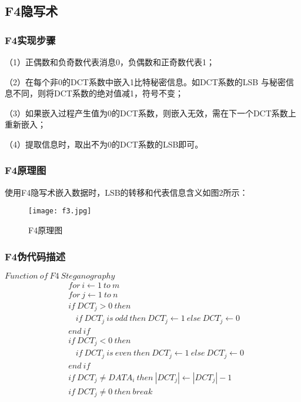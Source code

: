 \documentclass[onecolumn,a4paper,12pt]{article}
\begin{document}
\subsection{F4隐写术}

\subsubsection{F4实现步骤}

（1）正偶数和负奇数代表消息0，负偶数和正奇数代表1；

（2）在每个非0的DCT系数中嵌入1比特秘密信息。如DCT系数的LSB 与秘密信息不同，则将DCT系数的绝对值减1，符号不变；

（3）如果嵌入过程产生值为0的DCT系数，则嵌入无效，需在下一个DCT系数上重新嵌入；

（4）提取信息时，取出不为0的DCT系数的LSB即可。

\subsubsection{F4原理图}

使用F4隐写术嵌入数据时，LSB的转移和代表信息含义如图2所示：

\begin{figure}[H]
  \centering
  \texttt{[image: f3.jpg]}\\
  \caption{F4原理图}\label{F4原理图}
\end{figure}

\subsubsection{F4伪代码描述}
\qquad\qquad $Function\ of\ F4\ Steganography$
\begin{align*}
& for\ i \gets 1\ to\ m \\
& for\ j \gets 1\ to\ n \\
& if\ DCT_j>0\ then \\
& \ \ \ \ if\ DCT_j\ is\ odd\ then\ DCT_j \gets 1\ else\ DCT_j \gets 0 \\
& end\ if \\
& if\ DCT_j<0\ then \\
& \ \ \ \ if\ DCT_j\ is\ even\ then\ DCT_j \gets 1\ else\ DCT_j \gets 0 \\
& end\ if \\
& if\ DCT_j\not=DATA_i\ then\ \left|DCT_j\right| \gets \left|DCT_j\right|-1 \\
& if\ DCT_j\not=0\ then\ break
\end{align*}
\end{document}
